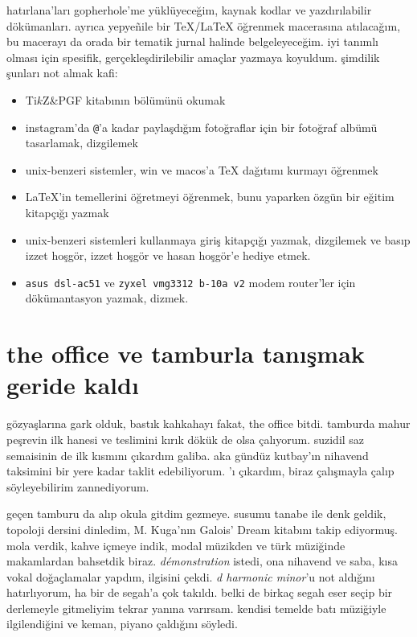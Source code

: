 \documentclass[9pt, a5paper, twocolumn, openright]{memoir}
\begin{document}
hatırlana'ları gopherhole'me yüklüyeceğim, kaynak kodlar ve
yazdırılabilir dökümanları. ayrıca yepye\~nile bir \TeX/\LaTeX{} öğrenmek
macerasına atılacağım, bu macerayı da orada bir tematik jurnal halinde
belgeleyeceğim. iyi tanımlı olması için spesifik, gerçekleşdirilebilir
amaçlar yazmaya koyuldum. şimdilik şunları not almak kafi:
\begin{itemize}
  \item Ti$k$Z\&PGF kitabının  bölümünü
  okumak
  \item instagram'da \texttt{@}'a kadar paylaşdığım fotoğraflar için bir
  fotoğraf albümü tasarlamak, dizgilemek
  \item unix-benzeri sistemler, win ve macos'a \TeX{} dağıtımı kurmayı
  öğrenmek
  \item \LaTeX'in temellerini öğretmeyi öğrenmek, bunu yaparken özgün bir
  eğitim kitapçığı yazmak
  \item unix-benzeri sistemleri kullanmaya giriş kitapçığı yazmak,
  dizgilemek ve basıp izzet hoşgör, izzet hoşgör ve hasan hoşgör'e
  hediye etmek.
  \item \texttt{asus dsl-ac51} ve \texttt{zyxel vmg3312 b-10a v2} modem
  router'ler için dökümantasyon yazmak, dizmek.
\end{itemize}
\section{the office ve tamburla tanışmak geride kaldı}
gözyaşlarına gark olduk, bastık kahkahayı fakat, the office bitdi.
tamburda mahur peşrevin ilk hanesi ve teslimini kırık dökük de olsa
çalıyorum. suzidil saz semaisinin de ilk kısmını çıkardım galiba. aka
gündüz kutbay'ın nihavend taksimini bir yere kadar taklit edebiliyorum.
'ı çıkardım, biraz çalışmayla
çalıp söyleyebilirim zannediyorum.

geçen tamburu da alıp okula gitdim gezmeye. susumu tanabe ile denk
geldik, topoloji dersini dinledim, M. Kuga'nın Galois' Dream kitabını
takip ediyormuş. mola verdik, kahve içmeye indik, modal müzikden ve türk
müziğinde makamlardan bahsetdik biraz. \textit{démonstration} istedi, ona
nihavend ve saba, kısa vokal doğaçlamalar yapdım, ilgisini çekdi.
\textit{d harmonic minor}'u not aldığını hatırlıyorum, ha bir de segah'a
çok takıldı. belki de birkaç segah eser seçip bir derlemeyle gitmeliyim
tekrar yanına varırsam. kendisi temelde batı müziğiyle ilgilendiğini ve
keman, piyano çaldığını söyledi.
\end{document}
